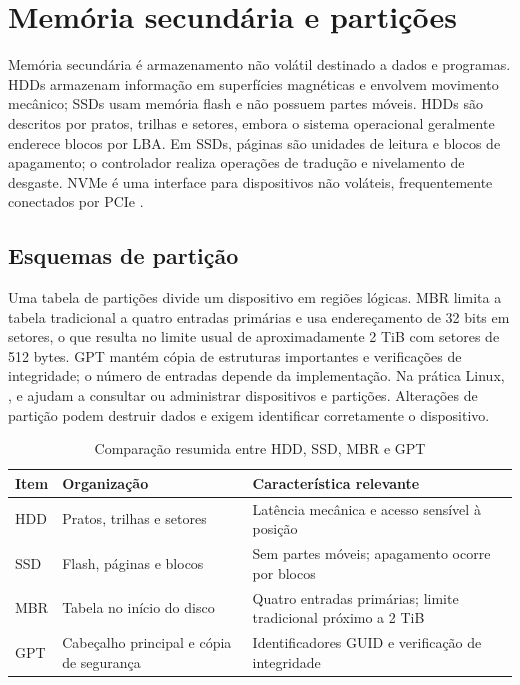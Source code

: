 \documentclass[12pt,a4paper,oneside]{article}
\newcommand{\comando}[1]{\texttt{\detokenize{#1}}}
\begin{document}
\section{Memória secundária e partições}
Memória secundária é armazenamento não volátil destinado a dados e programas. HDDs armazenam informação em superfícies magnéticas e envolvem movimento mecânico; SSDs usam memória flash e não possuem partes móveis. HDDs são descritos por pratos, trilhas e setores, embora o sistema operacional geralmente enderece blocos por LBA. Em SSDs, páginas são unidades de leitura e blocos de apagamento; o controlador realiza operações de tradução e nivelamento de desgaste. NVMe é uma interface para dispositivos não voláteis, frequentemente conectados por PCIe \cite{patterson,nvme}.

\subsection{Esquemas de partição}
Uma tabela de partições divide um dispositivo em regiões lógicas. MBR limita a tabela tradicional a quatro entradas primárias e usa endereçamento de 32 bits em setores, o que resulta no limite usual de aproximadamente 2 TiB com setores de 512 bytes. GPT mantém cópia de estruturas importantes e verificações de integridade; o número de entradas depende da implementação. Na prática Linux, \comando{lsblk}, \comando{fdisk} e \comando{parted} ajudam a consultar ou administrar dispositivos e partições. Alterações de partição podem destruir dados e exigem identificar corretamente o dispositivo.

\begin{table}[htbp]\centering
\caption{Comparação resumida entre HDD, SSD, MBR e GPT}\label{tab:armazenamento-particoes}
\begin{tabular}{>{\raggedright\arraybackslash}p{3cm}p{5cm}p{5cm}}
\toprule Item & Organização & Característica relevante\\\midrule
HDD & Pratos, trilhas e setores & Latência mecânica e acesso sensível à posição\\
SSD & Flash, páginas e blocos & Sem partes móveis; apagamento ocorre por blocos\\
MBR & Tabela no início do disco & Quatro entradas primárias; limite tradicional próximo a 2 TiB\\
GPT & Cabeçalho principal e cópia de segurança & Identificadores GUID e verificação de integridade\\\bottomrule
\end{tabular}\end{table}
\end{document}
